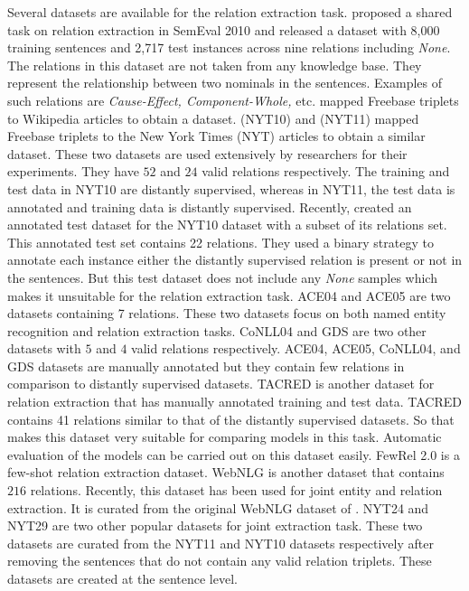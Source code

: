 Several datasets are available for the relation extraction task.  proposed a shared task on relation extraction in SemEval 2010 and released a dataset with 8,000 training sentences and 2,717 test instances across nine relations including {\em None}. The relations in this dataset are not taken from any knowledge base. They represent the relationship between two nominals in the sentences. Examples of such relations are {\em Cause-Effect, Component-Whole,} etc.  mapped Freebase  triplets to Wikipedia articles to obtain a dataset.  (NYT10) and  (NYT11) mapped Freebase triplets to the New York Times (NYT) articles to obtain a similar dataset. These two datasets are used extensively by researchers for their experiments. They have $52$ and $24$ valid relations respectively. The training and test data in NYT10 are distantly supervised, whereas in NYT11, the test data is annotated and training data is distantly supervised. Recently,  created an annotated test dataset for the NYT10 dataset with a subset of its relations set. This annotated test set contains 22 relations. They used a binary strategy to annotate each instance either the distantly supervised relation is present or not in the sentences. But this test dataset does not include any {\em None} samples which makes it unsuitable for the relation extraction task. ACE04  and ACE05  are two datasets containing 7 relations. These two datasets focus on both named entity recognition and relation extraction tasks. CoNLL04  and GDS  are two other datasets with $5$ and $4$ valid relations respectively. ACE04, ACE05, CoNLL04, and GDS datasets are manually annotated but they contain few relations in comparison to distantly supervised datasets. TACRED  is another dataset for relation extraction that has manually annotated training and test data. TACRED contains 41 relations similar to that of the distantly supervised datasets. So that makes this dataset very suitable for comparing models in this task. Automatic evaluation of the models can be carried out on this dataset easily. FewRel 2.0  is a few-shot relation extraction dataset. WebNLG  is another dataset that contains $216$ relations. Recently, this dataset has been used for joint entity and relation extraction. It is curated from the original WebNLG dataset of . NYT24  and NYT29  are two other popular datasets for joint extraction task. These two datasets are curated from the NYT11 and NYT10 datasets respectively after removing the sentences that do not contain any valid relation triplets. These datasets are created at the sentence level. 
